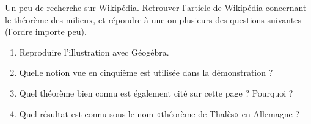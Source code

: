 
\begin{exercice}\label{exo2smath-0236}

    Un peu de recherche sur Wikipédia. Retrouver l'article de Wikipédia concernant le théorème des milieux, et répondre à une ou plusieurs des questions suivantes (l'ordre importe peu).
    \begin{enumerate}
        \item
            Reproduire l'illustration avec Géogébra.
        \item
            Quelle notion vue en cinquième est utilisée dans la démonstration ?
        \item
            Quel théorème bien connu est également cité sur cette page ? Pourquoi ?
        \item
            Quel résultat est connu sous le nom «théorème de Thalès» en Allemagne ?
    \end{enumerate}

\end{exercice}
